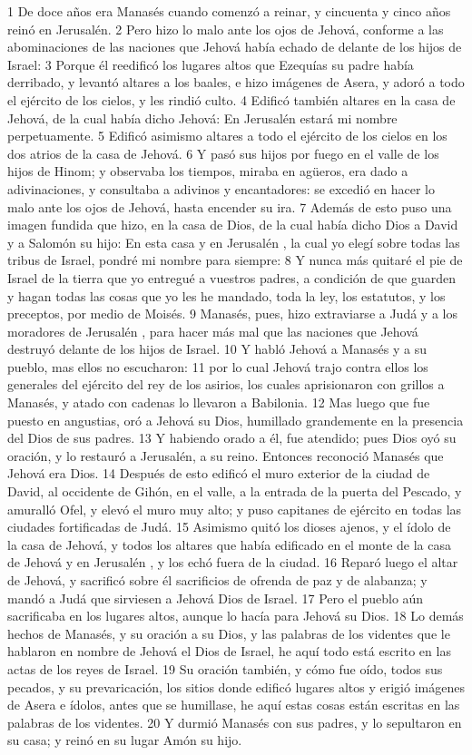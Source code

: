 1 De doce años era Manasés cuando comenzó a reinar, y cincuenta y cinco años reinó en Jerusalén.
2 Pero hizo lo malo ante los ojos de Jehová, conforme a las abominaciones de las naciones que Jehová había echado de delante de los hijos de Israel:
3 Porque él reedificó los lugares altos que Ezequías su padre había derribado, y levantó altares a los baales, e hizo imágenes de Asera, y adoró a todo el ejército de los cielos, y les rindió culto. 
4 Edificó también altares en la casa de Jehová, de la cual había dicho Jehová: En Jerusalén  estará mi nombre perpetuamente. 
5 Edificó asimismo altares a todo el ejército de los cielos en los dos atrios de la casa de Jehová.
6 Y pasó sus hijos por fuego en el valle de los hijos de Hinom; y observaba los tiempos, miraba en agüeros, era dado a adivinaciones, y consultaba a adivinos y encantadores: se excedió en hacer lo malo ante los ojos de Jehová, hasta encender su ira.
7 Además de esto puso una imagen fundida que hizo, en la casa de Dios, de la cual había dicho Dios a David y a Salomón su hijo: En esta casa y en Jerusalén , la cual yo elegí sobre todas las tribus de Israel, pondré mi nombre para siempre:
8 Y nunca más quitaré el pie de Israel de la tierra que yo entregué a vuestros padres, a condición de que guarden y hagan todas las cosas que yo les he mandado, toda la ley, los estatutos, y los preceptos, por medio de Moisés. 
9 Manasés, pues, hizo extraviarse a Judá y a los moradores de Jerusalén , para hacer más mal que las naciones que Jehová destruyó delante de los hijos de Israel.
10 Y habló Jehová a Manasés y a su pueblo, mas ellos no escucharon:
11 por lo cual Jehová trajo contra ellos los generales del ejército del rey de los asirios, los cuales aprisionaron con grillos a Manasés, y atado con cadenas lo llevaron a Babilonia.
12 Mas luego que fue puesto en angustias, oró a Jehová su Dios, humillado grandemente en la presencia del Dios de sus padres.
13 Y habiendo orado a él, fue atendido; pues Dios oyó su oración, y lo restauró a Jerusalén, a su reino. Entonces reconoció Manasés que Jehová era Dios.
14 Después de esto edificó el muro exterior de la ciudad de David, al occidente de Gihón, en el valle, a la entrada de la puerta del Pescado, y amuralló Ofel, y elevó el muro muy alto; y puso capitanes de ejército en todas las ciudades fortificadas de Judá.
15 Asimismo quitó los dioses ajenos, y el ídolo de la casa de Jehová, y todos los altares que había edificado en el monte de la casa de Jehová y en Jerusalén , y los echó fuera de la ciudad.
16 Reparó luego el altar de Jehová, y sacrificó sobre él sacrificios de ofrenda de paz y de alabanza; y mandó a Judá que sirviesen a Jehová Dios de Israel.
17 Pero el pueblo aún sacrificaba en los lugares altos, aunque lo hacía para Jehová su Dios.
18 Lo demás hechos de Manasés, y su oración a su Dios, y las palabras de los videntes que le hablaron en nombre de Jehová el Dios de Israel, he aquí todo está escrito en las actas de los reyes de Israel.
19 Su oración también, y cómo fue oído, todos sus pecados, y su prevaricación, los sitios donde edificó lugares altos y erigió imágenes de Asera e ídolos, antes que se humillase, he aquí estas cosas están escritas en las palabras de los videntes.
20 Y durmió Manasés con sus padres, y lo sepultaron en su casa; y reinó en su lugar Amón su hijo.
